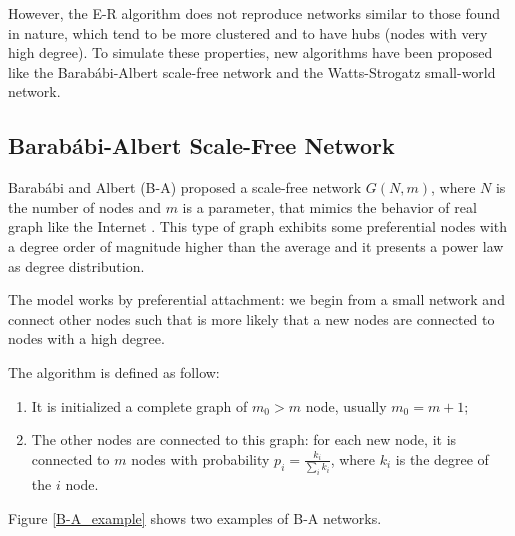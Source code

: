 However, the E-R algorithm does not reproduce networks similar to those found in nature, which tend to be more clustered and to have hubs (nodes with very high degree). To simulate these properties, new algorithms have been proposed like the Barab\'abi-Albert scale-free network and the Watts-Strogatz small-world network.

\subsection{Barab\'abi-Albert Scale-Free Network}
Barab\'abi and Albert (B-A) proposed a scale-free network $G(N, m)$, where $N$ is the number of nodes and $m$ is a parameter, that mimics the behavior of real graph like the Internet \cite{Barabasi_Albert_1999}. This type of graph exhibits some preferential nodes with a degree order of magnitude higher than the average and it presents a power law as degree distribution.

The model works by preferential attachment: we begin from a small network and connect other nodes such that is more likely that a new nodes are connected to nodes with a high degree. 

The algorithm is defined as follow:
\begin{enumerate}
    \item It is initialized a complete graph of $m_0 > m$ node, usually $m_0 = m+1$;
    \item The other nodes are connected to this graph: for each new node, it is connected to $m$ nodes with probability $p_i = \frac{k_i}{\sum_i k_i}$, where $k_i$ is the degree of the $i$ node.
\end{enumerate}
Figure \ref{B-A_example} shows two examples of B-A networks.

